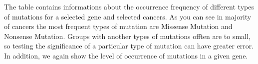 The table contains informations about the occurrence frequency of
different types of mutations for a selected gene and selected cancers.
As you can see in majority of cancers the most frequent types of
mutation are Missense Mutation and Nonsense Mutation. Groups with
another types of mutations offten are to small, so testing the
significance of a particular type of mutation can have greater error. In
addition, we again show the level of occurrence of mutations in a given
gene.

\citep{R}



\address{%
Marlena Bielat, \href{bielat.marlena@gmail.com}{\nolinkurl{bielat.marlena@gmail.com}}\\
Małgorzata Dobkowska, \href{gosia.dobkowska@tlen.pl}{\nolinkurl{gosia.dobkowska@tlen.pl}} \\
Sebastian Gargas, \href{gargass@student.mini.pw.edu.pl}{\nolinkurl{gargass@student.mini.pw.edu.pl}}\\
MiNI Warsaw University of Technology\\
\\
}

\address{%
Marlena Bielat, Małgorzata Dobkowska, Sebastian Gargas\\
MiNI Warsaw University of Technology\\
\\
}


